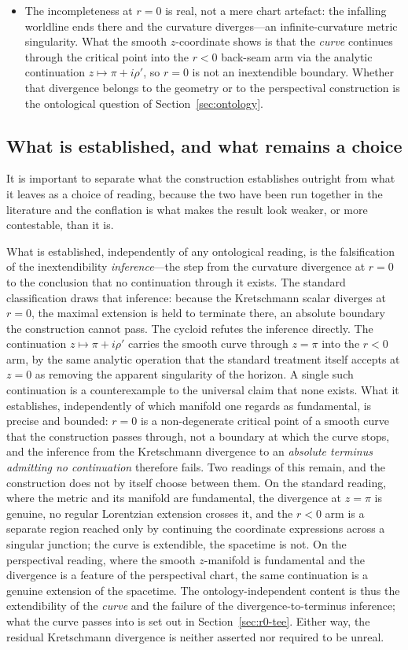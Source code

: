 \documentclass[11pt,a4paper]{article}
\theoremstyle{definition}
\begin{document}
\begin{itemize}
\item The incompleteness at $r = 0$ is real, not a mere chart artefact: the infalling worldline ends there and the curvature diverges---an infinite-curvature metric singularity. What the smooth $z$-coordinate shows is that the \emph{curve} continues through the critical point into the $r<0$ back-seam arm via the analytic continuation $z \mapsto \pi + i\rho'$, so $r=0$ is not an inextendible boundary. Whether that divergence belongs to the geometry or to the perspectival construction is the ontological question of Section~\ref{sec:ontology}.
\end{itemize}

\subsection{What is established, and what remains a choice}

It is important to separate what the construction establishes outright from what it leaves as a choice of reading, because the two have been run together in the literature and the conflation is what makes the result look weaker, or more contestable, than it is.

What is established, independently of any ontological reading, is the falsification of the inextendibility \emph{inference}---the step from the curvature divergence at $r=0$ to the conclusion that no continuation through it exists. The standard classification draws that inference: because the Kretschmann scalar diverges at $r=0$, the maximal extension is held to terminate there, an absolute boundary the construction cannot pass. The cycloid refutes the inference directly. The continuation $z \mapsto \pi + i\rho'$ carries the smooth curve through $z=\pi$ into the $r<0$ arm, by the same analytic operation that the standard treatment itself accepts at $z=0$ as removing the apparent singularity of the horizon. A single such continuation is a counterexample to the universal claim that none exists. What it establishes, independently of which manifold one regards as fundamental, is precise and bounded: $r=0$ is a non-degenerate critical point of a smooth curve that the construction passes through, not a boundary at which the curve stops, and the inference from the Kretschmann divergence to an \emph{absolute terminus admitting no continuation} therefore fails. Two readings of this remain, and the construction does not by itself choose between them. On the standard reading, where the metric and its manifold are fundamental, the divergence at $z=\pi$ is genuine, no regular Lorentzian extension crosses it, and the $r<0$ arm is a separate region reached only by continuing the coordinate expressions across a singular junction; the curve is extendible, the spacetime is not. On the perspectival reading, where the smooth $z$-manifold is fundamental and the divergence is a feature of the perspectival chart, the same continuation is a genuine extension of the spacetime. The ontology-independent content is thus the extendibility of the \emph{curve} and the failure of the divergence-to-terminus inference; what the curve passes into is set out in Section~\ref{sec:r0-tee}. Either way, the residual Kretschmann divergence is neither asserted nor required to be unreal.
\end{document}
